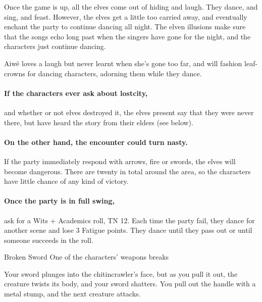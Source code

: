 \begin{multicols}{2}
Once the game is up, all the elves come out of hiding and laugh.  They dance, and sing, and feast.  However, the elves get a little too carried away, and eventually enchant the party to continue dancing all night.  The elven illusions make sure that the songs echo long past when the singers have gone for the night, and the characters just continue dancing.
 

Aiw\"{e} loves a laugh but never learnt when she's gone too far, and will fashion leaf-crowns for dancing characters, adorning them while they dance.



\paragraph{If the characters ever ask about \gls{lostcity},}
and whether or not elves destroyed it, the elves present say that they were never there, but have heard the story from their elders (see below).

\paragraph{On the other hand, the encounter could turn nasty.}
If the party immediately respond with arrows, fire or swords, the elves will become dangerous.
There are twenty in total around the area, so the characters have little chance of any kind of victory.

\paragraph{Once the party is in full swing,}
ask for a Wits + Academics roll, TN 12.
Each time the party fail, they dance for another scene and lose 3 Fatigue points.
They dance until they pass out or until someone succeeds in the roll.

{Broken Sword}%
{One of the characters' weapons breaks}%

\begin{boxtext}

  Your sword plunges into the chitincrawler's face, but as you pull it out, the creature twists its body, and your sword shatters.
  You pull out the handle with a metal stump, and the next creature attacks.


\end{boxtext}
\end{multicols}
